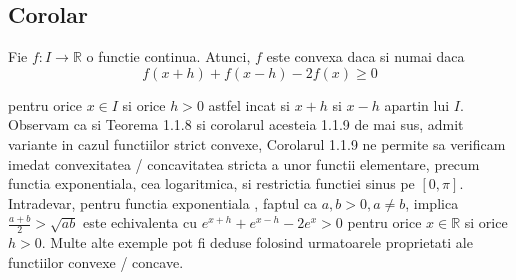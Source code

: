 \documentclass[a4paper,12pt,oneside]{report}
\begin{document}
\subsection{Corolar}

Fie \(f: I \rightarrow \mathbb{R}\) o functie continua. Atunci, \(f\) este convexa daca si numai daca
\begin{displaymath}
  f\left ( x+h \right )+ f\left ( x - h \right ) - 2f\left ( x \right )\geq 0
\end{displaymath}

pentru orice \(x \in I\) si orice \(h > 0\) astfel incat si \(x + h\) si \(x - h\) apartin lui \(I\). 
Observam ca si Teorema 1.1.8 si corolarul acesteia 1.1.9 de mai sus, admit variante in cazul functiilor strict convexe, 
Corolarul 1.1.9 ne permite sa verificam imedat convexitatea / concavitatea stricta a unor functii elementare, precum functia exponentiala, cea logaritmica, si restrictia functiei sinus pe \(\left [ 0 , \pi \right ]\). Intradevar, pentru functia exponentiala , faptul ca  \(a , b > 0, a\neq b\), implica \(\frac{a + b}{2}> \sqrt{ab}\)
este echivalenta cu 
\(e^{x + h} + e^{x - h } - 2e^{x}> 0\)
pentru orice \(x\in \mathbb{R}\) si orice \(h > 0\).
	Multe alte exemple pot fi deduse folosind urmatoarele proprietati ale functiilor convexe / concave. 
\end{document}
